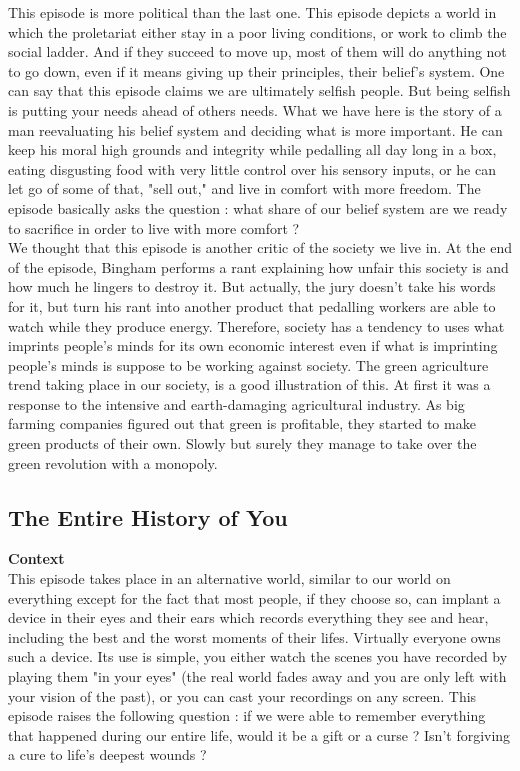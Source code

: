 \documentclass{article}
\begin{document}
This episode is more political than the last one. This episode depicts a world in which the proletariat either stay in a poor living conditions, or work to climb the social ladder. And if they succeed to move up, most of them will do anything not to go down, even if it means giving up their principles, their belief's system. One can say that this episode claims we are ultimately selfish people. But being selfish is putting your needs ahead of others needs. What we have here is the story of a man reevaluating his belief system and deciding what is more important. He can keep his moral high grounds and integrity while pedalling all day long in a box, eating disgusting food with very little control over his sensory inputs, or he can let go of some of that, "sell out," and live in comfort with more freedom. The episode basically asks the question : what share of our belief system are we ready to sacrifice in order to live with more comfort ?\\
We thought that this episode is another critic of the society we live in. At the end of the episode, Bingham performs a rant explaining how unfair this society is and how much he lingers to destroy it. But actually, the jury doesn't take his words for it, but turn his rant into another product that pedalling workers are able to watch while they produce energy. Therefore, society has a tendency to uses what imprints people's minds for its own economic interest even if what is imprinting people's minds is suppose to be working against society. The green agriculture trend taking place in our society, is a good illustration of this. At first it was a response to the intensive and earth-damaging agricultural industry. As big farming companies figured out that green is profitable, they started to make green products of their own. Slowly but surely they manage to take over the green revolution with a monopoly.

\subsection{The Entire History of You}
\textbf{Context}\\
This episode takes place in an alternative world, similar to our world on everything except for the fact that most people, if they choose so, can implant a device in their eyes and their ears which records everything they see and hear, including the best and the worst moments of their lifes. Virtually everyone owns such a device. Its use is simple, you either watch the scenes you have recorded by playing them "in your eyes" (the real world fades away and you are only left with your vision of the past), or you can cast your recordings on any screen. This episode raises the following question : if we were able to remember everything that happened during our entire life, would it be a gift or a curse ? Isn't forgiving a cure to life's deepest wounds ?
\end{document}
